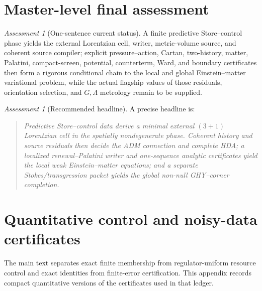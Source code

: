 \documentclass[11pt]{article}
\theoremstyle{definition}
\theoremstyle{remark}
\newtheorem{assessment}[theorem]{Assessment}
\begin{document}
\section{Master-level final assessment}

\begin{assessment}[One-sentence current status]
A finite predictive Store--control phase yields the external Lorentzian cell,
writer, metric-volume source, and coherent source compiler; explicit
pressure--action, Cartan, two-history, matter, Palatini, compact-screen,
potential, counterterm, Ward, and boundary certificates then form a rigorous
conditional chain to the local and global Einstein--matter variational
problem, while the actual flagship values of those residuals, orientation
selection, and \(G,\Lambda\) metrology remain to be supplied.
\end{assessment}

\begin{assessment}[Recommended headline]
A precise headline is:
\begin{quote}
\emph{Predictive Store--control data derive a minimal external \((3+1)\)
Lorentzian cell in the spatially nondegenerate phase.  Coherent history and
source residuals then decide the ADM connection and complete HDA; a localized
renewal--Palatini writer and one-sequence analytic certificates yield the local
weak Einstein--matter equations; and a separate Stokes/transgression packet
yields the global non-null GHY--corner completion.}
\end{quote}
\end{assessment}

\clearpage
\appendix


\section{Quantitative control and noisy-data certificates}
\label{app:quantitative-certificates-master}

The main text separates exact finite membership from regulator-uniform resource
control and exact identities from finite-error certification.  This appendix
records compact quantitative versions of the certificates used in that ledger.
\end{document}
